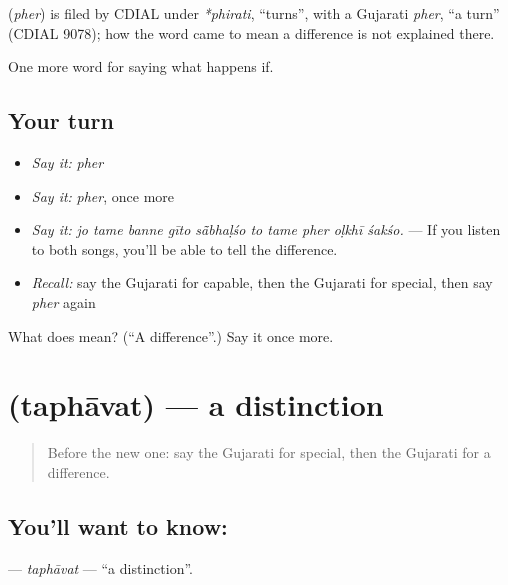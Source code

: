 \begin{cousinweb}
\textbf{} (\emph{pher}) is filed by CDIAL under \emph{*phirati}, \textquotedblleft{}turns\textquotedblright{}, with a Gujarati \emph{pher}, \textquotedblleft{}a turn\textquotedblright{} (CDIAL 9078); how the word came to mean a difference is not explained there.
\end{cousinweb}

\begin{grammarlens}[title={What you've built}]
One more word for saying what happens if.
\end{grammarlens}

\subsection*{Your turn}
\begin{itemize}
\raggedright
  \item \emph{Say it:} \emph{pher}
  \item \emph{Say it:} \emph{pher}, once more
  \item \emph{Say it:} \emph{jo tame banne gīto sā̃bhaḷśo to tame pher oḷkhī śakśo.} — If you listen to both songs, you'll be able to tell the difference.
  \item \emph{Recall:} say the Gujarati for capable, then the Gujarati for special, then say \emph{pher} again
\end{itemize}

\begin{tcolorbox}[breakable,colback=teal!4,colframe=teal!35!black,title={Before you move on}]
What does  mean? (\textquotedblleft{}A difference\textquotedblright{}.) Say it once more.
\end{tcolorbox}
\section[\texorpdfstring{\gu{તફાવત} (taphāvat)}{તફાવત (taphāvat)}]{ (taphāvat) — a distinction}

\label{lesson:GU-C544-taphavat}



\begin{quote}
Before the new one: say the Gujarati for special, then the Gujarati for a difference.
\end{quote}

\subsection*{You'll want to know: }
\textbf{} — \emph{taphāvat} — \textquotedblleft{}a distinction\textquotedblright{}.

